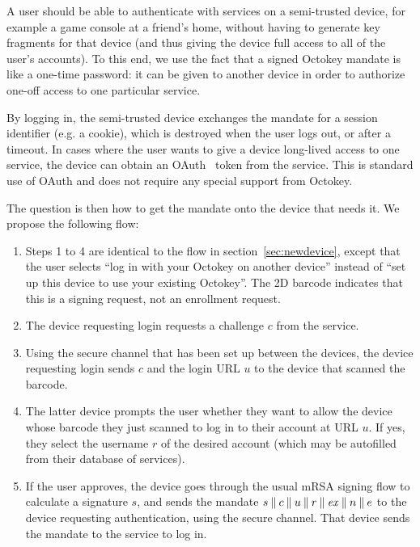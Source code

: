 A user should be able to authenticate with services on a semi-trusted device, for example a game
console at a friend's home, without having to generate key fragments for that device (and thus
giving the device full access to all of the user's accounts). To this end, we use the fact that a
signed Octokey mandate is like a one-time password: it can be given to another device in order to
authorize one-off access to one particular service.

By logging in, the semi-trusted device exchanges the mandate for a session identifier (e.g. a
cookie), which is destroyed when the user logs out, or after a timeout. In cases where the user
wants to give a device long-lived access to one service, the device can obtain an OAuth~\cite{OAuth}
token from the service. This is standard use of OAuth and does not require any special support from
Octokey.

The question is then how to get the mandate onto the device that needs it. We propose the following
flow:

\begin{enumerate}
\item Steps 1 to 4 are identical to the flow in section~\ref{sec:newdevice}, except that the user
selects ``log in with your Octokey on another device'' instead of ``set up this device to use your
existing Octokey''. The 2D barcode indicates that this is a signing request, not an enrollment
request.
\item The device requesting login requests a challenge $c$ from the service.
\item Using the secure channel that has been set up between the devices, the device requesting login
sends $c$ and the login URL $u$ to the device that scanned the barcode.
\item The latter device prompts the user whether they want to allow the device whose barcode they
just scanned to log in to their account at URL $u$. If yes, they select the username $r$ of the
desired account (which may be autofilled from their database of services).
\item If the user approves, the device goes through the usual mRSA signing flow to calculate a
signature $s$, and sends the mandate
$s \mathbin{\|} c \mathbin{\|} u \mathbin{\|} r \mathbin{\|} \mathit{ex} \mathbin{\|} n \mathbin{\|} e$
to the device requesting authentication, using the secure channel. That device sends the mandate to
the service to log in.
\end{enumerate}

%
%

